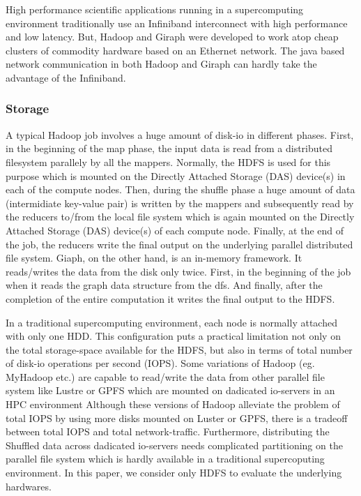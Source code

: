 \documentclass[conference]{IEEEtran}
\begin{document}
High performance scientific applications running in a supercomputing environment traditionally use an Infiniband interconnect with high performance and low latency.
But, Hadoop and Giraph were developed to work atop cheap clusters of commodity hardware based on an Ethernet network.
The java based network communication in both Hadoop and Giraph can hardly take the advantage of the Infiniband.

\subsubsection {Storage}
A typical Hadoop job involves a huge amount of disk-io in different phases. 
First, in the beginning of the map phase, the input data is read from a distributed filesystem parallely by all the mappers.
Normally, the HDFS is used for this purpose which is mounted on the Directly Attached Storage (DAS) device(s) in each of the compute nodes. 
Then, during the shuffle phase a huge amount of data (intermidiate key-value pair) is written by the mappers and subsequently read by the reducers to/from the local file system which is again mounted on the Directly Attached Storage (DAS) device(s) of each compute node.
Finally, at the end of the job, the reducers write the final output on the underlying parallel distributed file system.
Giaph, on the other hand, is an in-memory framework. It reads/writes the data from the disk only twice. First, in the beginning of the job when it reads the graph data structure from the dfs. And finally, after the completion of the entire computation it writes the final output to the HDFS.

In a traditional supercomputing environment, each node is normally attached with only one HDD. 
This configuration puts a practical limitation not only on the total storage-space available for the HDFS, but also in terms of total number of disk-io operations per second (IOPS).
Some variations of Hadoop (eg. MyHadoop etc.) are capable to read/write the data from other parallel file system like Lustre or GPFS which are mounted on dadicated io-servers in an HPC environment 
Although these versions of Hadoop alleviate the problem of total IOPS by using more disks mounted on Luster or GPFS, there is a tradeoff between total IOPS and total network-traffic.
Furthermore, distributing the Shuffled data across dadicated io-servers needs complicated partitioning on the parallel file system which is hardly available in a traditional supercoputing environment.
In this paper, we consider only HDFS to evaluate the underlying hardwares.
\end{document}
